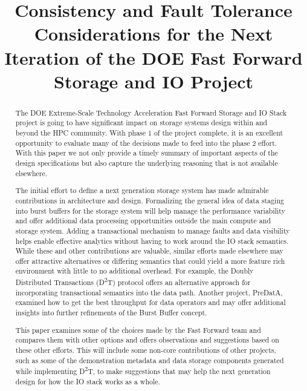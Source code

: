 \documentclass[conference]{IEEEtran}
\newcommand{\DDTns}{D\textsuperscript{2}T}
\begin{document}

\title{Consistency and Fault Tolerance Considerations for the Next Iteration of the DOE Fast Forward Storage and IO Project}

\author{
\and
{}
\and
{}
}
\maketitle

\begin{abstract}
The DOE Extreme-Scale Technology Acceleration Fast Forward Storage and IO Stack
project is going to have significant impact on storage systems design within
and beyond the HPC community. With phase 1 of the project complete, it is an
excellent opportunity to evaluate many of the decisions made to feed into the
phase 2 effort. With this paper we not only provide a timely summary of
important aspects of the design specifications but also capture the underlying
reasoning that is not available elsewhere.

The initial effort to define a next generation storage system has made
admirable contributions in architecture and design.  Formalizing the general
idea of data staging into burst buffers for the storage system will help manage
the performance variability and offer additional data processing opportunities
outside the main compute and storage system. Adding a transactional mechanism
to manage faults and data visibility helps enable effective analytics without
having to work around the IO stack semantics. While these and other
contributions are valuable, similar efforts made elsewhere may offer attractive
alternatives or differing semantics that could yield a more feature rich
environment with little to no additional overhead. For example, the Doubly
Distributed Transactions (\DDTns) protocol offers an alternative approach for
incorporating transactional semantics into the data path. Another project,
PreDatA, examined how to get the best throughput for data operators and may
offer additional insights into further refinements of the Burst Buffer concept.

This paper examines some of the choices made by the Fast Forward team and
compares them with other options and offers observations and suggestions based
on these other efforts.  This will include some non-core contributions of other
projects, such as some of the demonstration metadata and data storage
components generated while implementing \DDTns, to make suggestions that may
help the next generation design for how the IO stack works as a whole.

\end{abstract}
\end{document}
